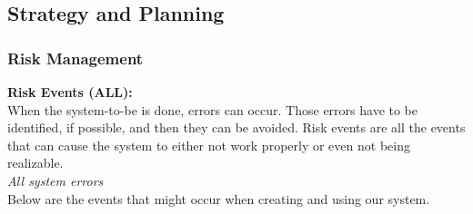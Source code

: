 \documentclass[12pt,a4paper]{report}
\begin{document}
\subsection{Strategy and Planning}
\subsubsection{Risk Management}
\textbf{Risk Events (ALL):}\\

When the system-to-be is done, errors can occur. Those errors have to be identified, if possible, and then they can be avoided. Risk events are all the events that can cause the system to either not work properly or even not being realizable.\\


\textit{All system errors}\\

Below are the events that might occur when creating and using our system.
\end{document}
